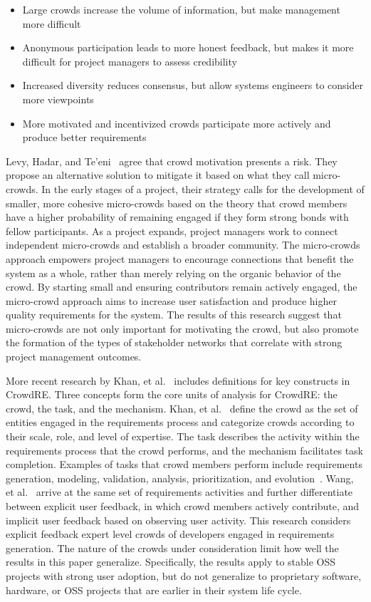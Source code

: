 \begin{itemize}
    \item Large crowds increase the volume of information, but make management more difficult
    \item Anonymous participation leads to more honest feedback, but makes it more difficult for project managers to assess credibility
    \item Increased diversity reduces consensus, but allow systems engineers to consider more viewpoints
    \item More motivated and incentivized crowds participate more actively and produce better requirements
\end{itemize}

Levy, Hadar, and Te'eni~\cite{levy} agree that crowd motivation presents a risk. They propose an alternative solution to mitigate it based on what they call micro-crowds. In the early stages of a project, their strategy calls for the development of smaller, more cohesive micro-crowds based on the theory that crowd members have a higher probability of remaining engaged if they form strong bonds with fellow participants. As a project expands, project managers work to connect independent micro-crowds and establish a broader community. The micro-crowds approach empowers project managers to encourage connections that benefit the system as a whole, rather than merely relying on the organic behavior of the crowd. By starting small and ensuring contributors remain actively engaged, the micro-crowd approach aims to increase user satisfaction and produce higher quality requirements for the system. The results of this research suggest that micro-crowds are not only important for motivating the crowd, but also promote the formation of the types of stakeholder networks that correlate with strong project management outcomes.

More recent research by Khan, et al.~\cite{khan} includes definitions for key constructs in CrowdRE. Three concepts form the core units of analysis for CrowdRE: the crowd, the task, and the mechanism. Khan, et al.~\cite{khan} define the crowd as the set of entities engaged in the requirements process and categorize crowds according to their scale, role, and level of expertise. The task describes the activity within the requirements process that the crowd performs, and the mechanism facilitates task completion. Examples of tasks that crowd members perform include requirements generation, modeling, validation, analysis, prioritization, and evolution~\cite{khan}. Wang, et al.~\cite{wang} arrive at the same set of requirements activities and further differentiate between explicit user feedback, in which crowd members actively contribute, and implicit user feedback based on observing user activity. This research considers explicit feedback expert level crowds of developers engaged in requirements generation. The nature of the crowds under consideration limit how well the results in this paper generalize. Specifically, the results apply to stable OSS projects with strong user adoption, but do not generalize to proprietary software, hardware, or OSS projects that are earlier in their system life cycle.

